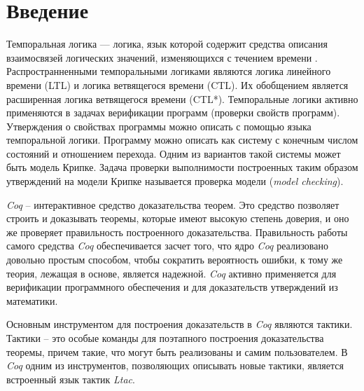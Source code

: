\documentclass[12pt]{article}
\begin{document}
  \mdissPutTitleContents

  \section{Введение}
  
  
Темпоральная логика — логика, язык которой содержит средства описания взаимосвязей логических значений, изменяющихся с течением времени \cite{Clark}. Распространненными темпоральными логиками являются логика линейного времени (LTL) и логика ветвящегося времени (CTL). Их обобщением является расширенная логика ветвящегося времени (CTL*). Темпоральные логики активно применяются в задачах верификации программ (проверки свойств программ). Утверждения о свойствах программы можно описать с помощью языка темпоральной логики. 
Программу можно описать как систему с конечным числом состояний и отношением перехода. Одним из вариантов такой системы может быть модель Крипке. Задача проверки выполнимости построенных таким образом утверждений на модели Крипке называется проверка модели (\textit{model checking}).

\textit{Coq} -- интерактивное средство доказательства теорем. Это средство позволяет строить и доказывать теоремы, которые имеют высокую степень доверия, и оно же проверяет правильность построенного доказательства. 
Правильность работы самого средства \textit{Coq} обеспечивается засчет того, что ядро \textit{Coq} реализовано довольно простым способом, чтобы сократить вероятность ошибки, к тому же теория, лежащая в основе, является надежной. 
\textit{Coq} активно применяется для верификации программного обеспечения \cite{CompCert} \cite{SoftwareFoundations6} и для доказательств утверждений из математики\cite{mathcomp}. 

Основным инструментом для построения доказательств в \textit{Coq} являются тактики. Тактики -- это особые команды для поэтапного построения доказательства теоремы, причем такие, что могут быть реализованы и самим пользователем.
В \textit{Coq} одним из инструментов, позволяющих описывать новые тактики, является встроенный язык тактик \textit{Ltac}\cite{LtacRef}. 
\end{document}
